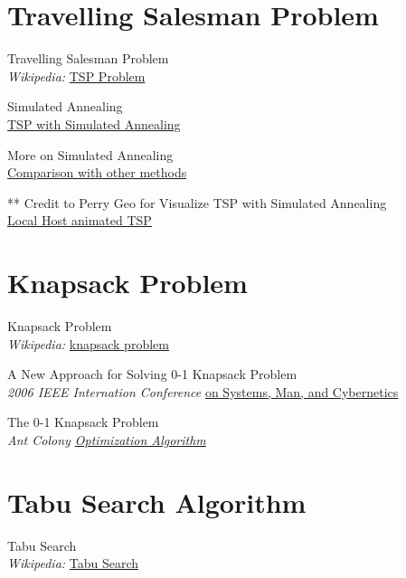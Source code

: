 \documentclass[conference]{IEEEtran}
\begin{document}
\begin{thebibliography}{9}
\setcounter{section}{0}
\renewcommand*{\theHsection}{chX.\the\value{section}}
\section{Travelling Salesman Problem}

Travelling Salesman Problem \\
\textit{Wikipedia:}
\href{https://en.wikipedia.org/wiki/Travelling_salesman_problem}{TSP Problem}

Simulated Annealing \\
\href{https://www.fourmilab.ch/documents/travelling/anneal/}{TSP with Simulated Annealing}

More on Simulated Annealing \\ \href{https://towardsdatascience.com/how-to-solve-the-traveling-salesman-problem-a-comparative-analysis-39056a916c9f}{Comparison with other methods}

** Credit to Perry Geo for Visualize TSP with Simulated Annealing \\
\href{https://perrygeo.github.io/sa-tsp-cljs/}{Local Host animated TSP}

\section{Knapsack Problem}
Knapsack Problem \\
\textit{Wikipedia:}
\href{https://en.wikipedia.org/wiki/Knapsack_problem}{knapsack problem}

A New Approach for Solving 0-1 Knapsack Problem\\
\textit{2006 IEEE Internation Conference}
\href{https://ieeexplore.ieee.org/document/4274362}{on Systems, Man, and Cybernetics}

The 0-1 Knapsack Problem\\
\textit{Ant Colony \href{https://repozytorium.biblos.pk.edu.pl/redo/resources/30706/file/suwFiles/SchiffK_AntColony.pdf}{Optimization Algorithm}}

\section{Tabu Search Algorithm}

Tabu Search\\
\textit{Wikipedia:}
\href{https://en.wikipedia.org/wiki/Tabu_search}{Tabu Search}


\end{thebibliography}
\end{document}
